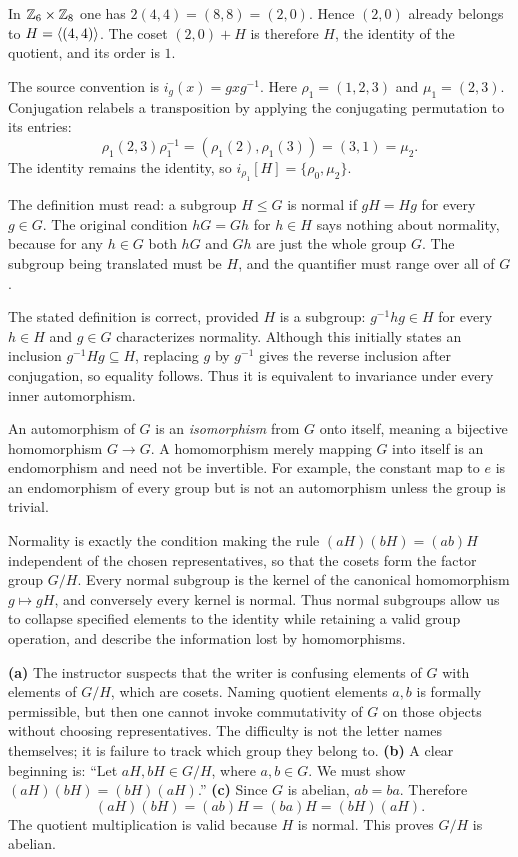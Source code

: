In $\mathbb{Z}_6\times\mathbb{Z}_8$ one has $2(4,4)=(8,8)=(2,0)$. Hence $(2,0)$ already belongs to $H=\langle (4,4)\rangle$. The coset $(2,0)+H$ is therefore $H$, the identity of the quotient, and its order is $1$.

The source convention is $i_g(x)=gxg^{-1}$. Here $\rho_1=(1,2,3)$ and $\mu_1=(2,3)$. Conjugation relabels a transposition by applying the conjugating permutation to its entries:
\[\rho_1(2,3)\rho_1^{-1}=(\rho_1(2),\rho_1(3))=(3,1)=\mu_2.\]
The identity remains the identity, so $i_{\rho_1}[H]=\{\rho_0,\mu_2\}$.

The definition must read: a subgroup $H\le G$ is normal if $gH=Hg$ for every $g\in G$. The original condition $hG=Gh$ for $h\in H$ says nothing about normality, because for any $h\in G$ both $hG$ and $Gh$ are just the whole group $G$. The subgroup being translated must be $H$, and the quantifier must range over all of $G$.

The stated definition is correct, provided $H$ is a subgroup: $g^{-1}hg\in H$ for every $h\in H$ and $g\in G$ characterizes normality. Although this initially states an inclusion $g^{-1}Hg\subseteq H$, replacing $g$ by $g^{-1}$ gives the reverse inclusion after conjugation, so equality follows. Thus it is equivalent to invariance under every inner automorphism.

An automorphism of $G$ is an \emph{isomorphism} from $G$ onto itself, meaning a bijective homomorphism $G\to G$. A homomorphism merely mapping $G$ into itself is an endomorphism and need not be invertible. For example, the constant map to $e$ is an endomorphism of every group but is not an automorphism unless the group is trivial.

Normality is exactly the condition making the rule $(aH)(bH)=(ab)H$ independent of the chosen representatives, so that the cosets form the factor group $G/H$. Every normal subgroup is the kernel of the canonical homomorphism $g\mapsto gH$, and conversely every kernel is normal. Thus normal subgroups allow us to collapse specified elements to the identity while retaining a valid group operation, and describe the information lost by homomorphisms.

\textbf{(a)} The instructor suspects that the writer is confusing elements of $G$ with elements of $G/H$, which are cosets. Naming quotient elements $a,b$ is formally permissible, but then one cannot invoke commutativity of $G$ on those objects without choosing representatives. The difficulty is not the letter names themselves; it is failure to track which group they belong to.
\textbf{(b)} A clear beginning is: ``Let $aH,bH\in G/H$, where $a,b\in G$. We must show $(aH)(bH)=(bH)(aH)$.''
\textbf{(c)} Since $G$ is abelian, $ab=ba$. Therefore
\[(aH)(bH)=(ab)H=(ba)H=(bH)(aH).\]
The quotient multiplication is valid because $H$ is normal. This proves $G/H$ is abelian.


